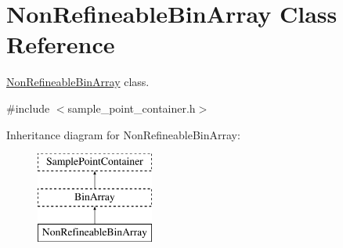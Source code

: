 \hypertarget{classNonRefineableBinArray}{}\section{Non\+Refineable\+Bin\+Array Class Reference}
\label{classNonRefineableBinArray}


\hyperlink{classNonRefineableBinArray}{Non\+Refineable\+Bin\+Array} class.  




{\ttfamily \#include $<$sample\+\_\+point\+\_\+container.\+h$>$}

Inheritance diagram for Non\+Refineable\+Bin\+Array\+:\begin{figure}[H]
\begin{center}
\leavevmode
\includegraphics[height=3.000000cm]{classNonRefineableBinArray}
\end{center}
\end{figure}
